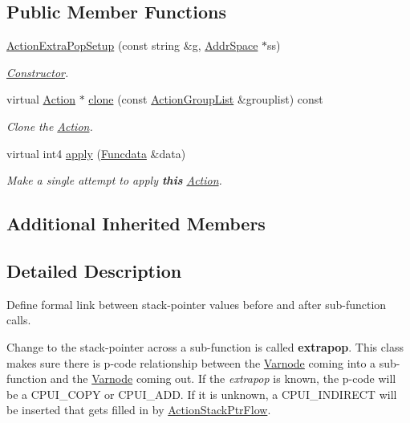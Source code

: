 \subsection*{Public Member Functions}
\begin{DoxyCompactItemize}
\item 
\mbox{\hyperlink{class_action_extra_pop_setup_a4359e4f80655118c2e8e8ac146166319}{Action\+Extra\+Pop\+Setup}} (const string \&g, \mbox{\hyperlink{class_addr_space}{Addr\+Space}} $\ast$ss)
\begin{DoxyCompactList}\small\item\em \mbox{\hyperlink{class_constructor}{Constructor}}. \end{DoxyCompactList}\item 
virtual \mbox{\hyperlink{class_action}{Action}} $\ast$ \mbox{\hyperlink{class_action_extra_pop_setup_aa4e0ef3d72672cf8fad9dea555a99cb8}{clone}} (const \mbox{\hyperlink{class_action_group_list}{Action\+Group\+List}} \&grouplist) const
\begin{DoxyCompactList}\small\item\em Clone the \mbox{\hyperlink{class_action}{Action}}. \end{DoxyCompactList}\item 
virtual int4 \mbox{\hyperlink{class_action_extra_pop_setup_a1518c4ca7772ccb59b6cde0857cf657c}{apply}} (\mbox{\hyperlink{class_funcdata}{Funcdata}} \&data)
\begin{DoxyCompactList}\small\item\em Make a single attempt to apply {\bfseries{this}} \mbox{\hyperlink{class_action}{Action}}. \end{DoxyCompactList}\end{DoxyCompactItemize}
\subsection*{Additional Inherited Members}


\subsection{Detailed Description}
Define formal link between stack-\/pointer values before and after sub-\/function calls. 

Change to the stack-\/pointer across a sub-\/function is called {\bfseries{extrapop}}. This class makes sure there is p-\/code relationship between the \mbox{\hyperlink{class_varnode}{Varnode}} coming into a sub-\/function and the \mbox{\hyperlink{class_varnode}{Varnode}} coming out. If the {\itshape extrapop} is known, the p-\/code will be a C\+P\+U\+I\+\_\+\+C\+O\+PY or C\+P\+U\+I\+\_\+\+A\+DD. If it is unknown, a C\+P\+U\+I\+\_\+\+I\+N\+D\+I\+R\+E\+CT will be inserted that gets filled in by \mbox{\hyperlink{class_action_stack_ptr_flow}{Action\+Stack\+Ptr\+Flow}}. 

